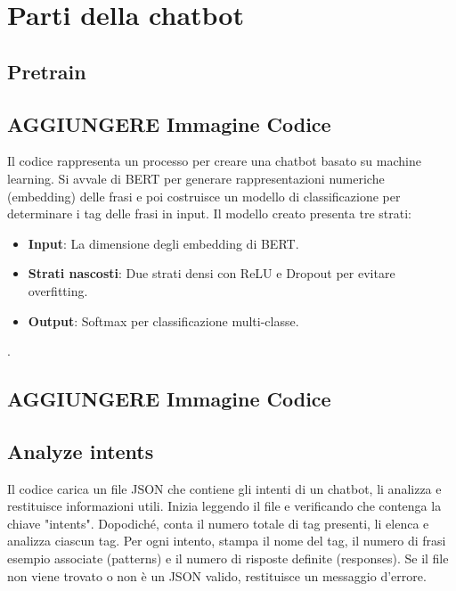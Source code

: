 \documentclass[12pt, letterpaper]{article}
\begin{document}
\section{Parti della chatbot}
\subsection{Pretrain}
\subsection{AGGIUNGERE Immagine Codice}
Il codice rappresenta un processo per creare una chatbot basato su machine learning. Si avvale di BERT per generare rappresentazioni numeriche (embedding) delle frasi e poi costruisce un modello di classificazione per determinare i tag delle frasi in input. 
Il modello creato presenta tre strati: 
\begin{itemize}
\item \textbf{Input}:  La dimensione degli embedding di BERT.
\item \textbf{Strati nascosti}: Due strati densi con ReLU e Dropout per evitare overfitting.
\item \textbf{Output}: Softmax per classificazione multi-classe.
\end{itemize}.

\subsection{AGGIUNGERE Immagine Codice}

\subsection{Analyze intents}
Il codice carica un file JSON che contiene gli intenti di un chatbot, li analizza e restituisce informazioni utili. Inizia leggendo il file e verificando che contenga la chiave "intents". Dopodiché, conta il numero totale di tag presenti, li elenca e analizza ciascun tag. Per ogni intento, stampa il nome del tag, il numero di frasi esempio associate (patterns) e il numero di risposte definite (responses). Se il file non viene trovato o non è un JSON valido, restituisce un messaggio d'errore.
\end{document}
